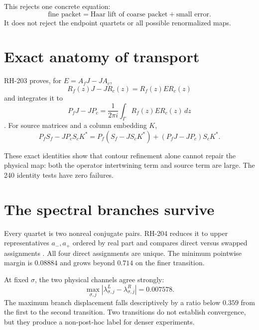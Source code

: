\documentclass[12pt]{article}
\theoremstyle{remark}\newtheorem{remark}[theorem]{Remark}
\begin{document}
This rejects one concrete equation:
\begin{equation*}
 \text{fine packet}=\text{Haar lift of coarse packet}+\text{small error}.
\end{equation*}
It does not reject the endpoint quartets or all possible renormalized maps.

\section{Exact anatomy of transport}

RH-203 proves, for $E=A_fJ-JA_c$,
\begin{equation}\label{eq:resolvent}
 R_f(z)J-JR_c(z)=R_f(z)ER_c(z)
\end{equation}
and integrates it to
\begin{equation}\label{eq:projector}
 P_fJ-JP_c=\frac{1}{2\pi i}\int_\Gamma R_f(z)ER_c(z)\,dz
\end{equation}
\citep{WangRH203}.  For source matrices and a column embedding $K$,
\begin{equation}\label{eq:channel}
 P_fS_f-JP_cS_cK^*
 =P_f(S_f-JS_cK^*)+(P_fJ-JP_c)S_cK^*.
\end{equation}

These exact identities show that contour refinement alone cannot repair the
physical map: both the operator intertwining term and source term are large.
The 240 identity tests have zero failures.

\section{The spectral branches survive}

Every quartet is two nonreal conjugate pairs.  RH-204 reduces it to upper
representatives $a_-,a_+$ ordered by real part and compares direct versus
swapped assignments \citep{WangRH204}.  All four direct assignments are
unique.  The minimum pointwise margin is $0.08884$ and grows beyond $0.714$
on the finer transition.

At fixed $\sigma$, the two physical channels agree strongly:
\begin{equation}\label{eq:channel-branch}
 \max_{\sigma,j}|\lambda^L_{\sigma,j}-\lambda^R_{\sigma,j}|
 =0.007578.
\end{equation}
The maximum branch displacement falls descriptively by a ratio below
$0.359$ from the first to the second transition.  Two transitions do not
establish convergence, but they produce a non-post-hoc label for denser
experiments.
\end{document}
